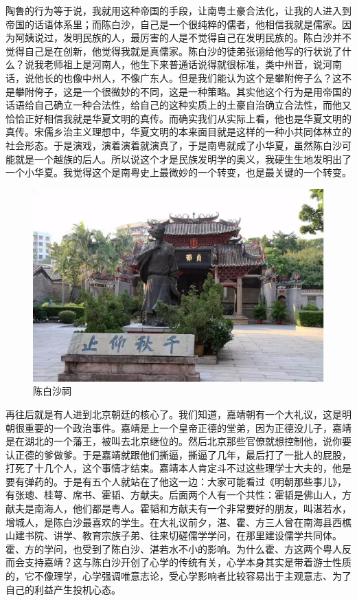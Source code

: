 陶鲁的行为等于说，我就用这种帝国的手段，让南粤土豪合法化，让我的人进入到帝国的话语体系里；而陈白沙，自己是一个很纯粹的儒者，他相信我就是儒家。因为阿姨说过，发明民族的人，最厉害的人是不觉得自己在发明民族的。陈白沙并不觉得自己是在创新，他觉得我就是真儒家。陈白沙的徒弟张诩给他写的行状说了什么？说我老师祖上是河南人，他生下来普通话说得就很标准，类中州音，说河南话，说他长的也像中州人，不像广东人。但是我们能认为这个是攀附侉子么？这不是攀附侉子，这是一个很微妙的不同，这是一种策略。其实他这个行为是用帝国的话语给自己确立一种合法性，给自己的这种实质上的土豪自治确立合法性，而他又恰恰正好相信我就是华夏文明的真传。而确实我们从实际上看，他也是华夏文明的真传。宋儒乡治主义理想中，华夏文明的本来面目就是这样的一种小共同体林立的社会形态。于是演戏，演着演着就演真了，于是南粤就成了小华夏，虽然陈白沙可能就是一个越族的后人。所以说这个才是民族发明学的奥义，我硬生生地发明出了一个小华夏。我觉得这个是南粤史上最微妙的一个转变，也是最关键的一个转变。

\begin{figure}
	\centering
	\includegraphics[width=\textwidth]{images/image-54}
	\caption{陈白沙祠}
\end{figure}

再往后就是有人进到北京朝廷的核心了。我们知道，嘉靖朝有一个大礼议，这是明朝很重要的一个政治事件。嘉靖是上一个皇帝正德的堂弟，因为正德没儿子，嘉靖是在湖北的一个藩王，被叫去北京继位的。然后北京那些官僚就想控制他，说你要认正德的爹做爹。于是嘉靖就跟他们撕逼，撕逼了几年，最后打了一批人的屁股，打死了十几个人，这个事情才结束。嘉靖本人肯定斗不过这些理学士大夫的，他是要有弹药的。于是有五个人就站在了他这一边：大家可能看过《明朝那些事儿》，有张璁、桂萼、席书、霍韬、方献夫。后面两个人有一个共性：霍韬是佛山人，方献夫是南海人，他们都是粤人。霍韬和方献夫有一个非常要好的朋友，叫湛若水，增城人，是陈白沙最喜欢的学生。在大礼议前夕，湛、霍、方三人曾在南海县西樵山建书院、讲学、教育宗族子弟、往来切磋儒学学问，在那里建设儒学共同体。霍、方的学问，也受到了陈白沙、湛若水不小的影响。为什么霍、方这两个粤人反而会支持嘉靖？这与陈白沙开创了心学的传统有关，心学本身其实是带着游士性质的，它不像理学，心学强调唯意志论，受心学影响者比较容易出于主观意志、为了自己的利益产生投机心态。

